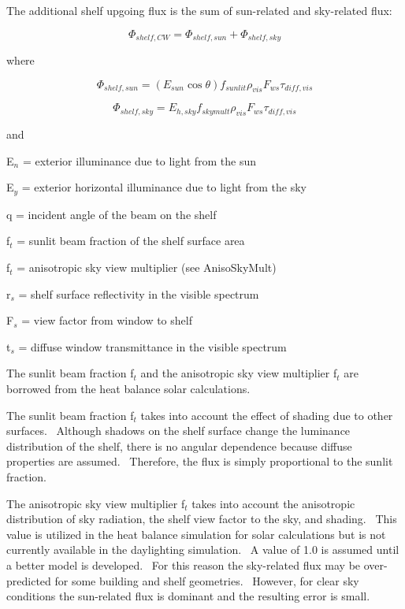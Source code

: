 The additional shelf upgoing flux is the sum of sun-related and sky-related flux:

\begin{equation}
{\Phi_{shelf,CW}} = {\Phi_{shelf,sun}} + {\Phi_{shelf,sky}}
\end{equation}

where

\begin{equation}
{\Phi_{shelf,sun}} = \left( {{E_{sun}}\cos \theta } \right){f_{sunlit}}{\rho_{vis}}{F_{ws}}{\tau_{diff,vis}}
\end{equation}

\begin{equation}
{\Phi_{shelf,sky}} = {E_{h,sky}}{f_{skymult}}{\rho_{vis}}{F_{ws}}{\tau_{diff,vis}}
\end{equation}

and

E\(_{n}\) = exterior illuminance due to light from the sun

E\(_{y}\) = exterior horizontal illuminance due to light from the sky

q = incident angle of the beam on the shelf

f\(_{t}\) = sunlit beam fraction of the shelf surface area

f\(_{t}\) = anisotropic sky view multiplier (see AnisoSkyMult)

r\(_{s}\) = shelf surface reflectivity in the visible spectrum

F\(_{s}\) = view factor from window to shelf

t\(_{s}\) = diffuse window transmittance in the visible spectrum

The sunlit beam fraction f\(_{t}\) and the anisotropic sky view multiplier f\(_{t}\) are borrowed from the heat balance solar calculations.

The sunlit beam fraction f\(_{t}\) takes into account the effect of shading due to other surfaces.~ Although shadows on the shelf surface change the luminance distribution of the shelf, there is no angular dependence because diffuse properties are assumed.~ Therefore, the flux is simply proportional to the sunlit fraction.

The anisotropic sky view multiplier f\(_{t}\) takes into account the anisotropic distribution of sky radiation, the shelf view factor to the sky, and shading.~ This value is utilized in the heat balance simulation for solar calculations but is not currently available in the daylighting simulation.~ A value of 1.0 is assumed until a better model is developed.~ For this reason the sky-related flux may be over-predicted for some building and shelf geometries.~ However, for clear sky conditions the sun-related flux is dominant and the resulting error is small.

